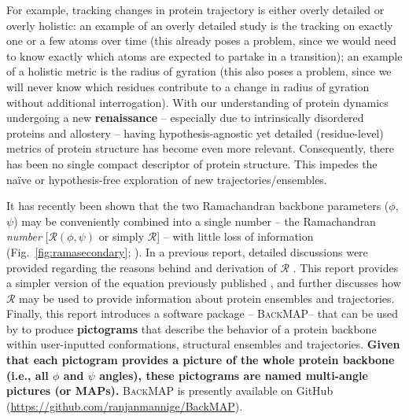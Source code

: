 \documentclass[fleqn,10pt,lineno]{wlpeerj} %
\newcommand{\Fig}[1]{Fig.~\ref{#1}}
\newcommand{\n}[1]{{\textbf{\color{red}#1}}}
\newcommand{\gname}{BackMAP}
\newcommand{\pname}{\textsc{\gname}\xspace}
\begin{document}
For example, tracking changes in protein trajectory is either overly detailed or overly holistic: an example of an overly detailed study is the tracking on exactly one or a few atoms over time (this already poses a problem, since we would need to know exactly which atoms are expected to partake in a transition); an example of a holistic metric is the radius of gyration (this also poses a problem, since we will never know which residues contribute to a change in radius of gyration without additional interrogation). %
With our understanding of protein dynamics undergoing a new \n{renaissance} -- especially due to intrinsically disordered proteins and allostery -- having hypothesis-agnostic yet detailed (residue-level) metrics of protein structure has become even more relevant. 
Consequently, there has been no single compact descriptor of protein structure. This impedes the na{\"i}ve or hypothesis-free exploration of new trajectories/ensembles. %

It has recently been shown that the two Ramachandran backbone parameters ($\phi$,$\psi$) may be conveniently combined into a single number -- the Ramachandran \textit{number} [$\mathcal{R}(\phi,\psi)$ or simply $\mathcal{R}$] -- with little loss of information (\Fig{fig:ramasecondary}; \cite{Mannige2016}). 
In a previous report, detailed discussions were provided regarding the reasons behind and derivation of $\mathcal{R}$ \citep{Mannige2016}. This report provides a simpler version of the equation previously published \citep{Mannige2016}, and further discusses how $\mathcal{R}$ may be used to provide information about protein ensembles and trajectories. 
Finally, this report introduces a software package -- \pname -- that can be used by to produce \n{pictograms} that describe the behavior of a protein backbone within user-inputted conformations, structural ensembles and trajectories. 
\n{Given that each pictogram provides a picture of the whole protein backbone (i.e., all $\phi$ and $\psi$ angles), these pictograms are 
named multi-angle pictures (or MAPs).} %
\pname is presently available on GitHub (\url{https://github.com/ranjanmannige/\gname}).
\end{document}
